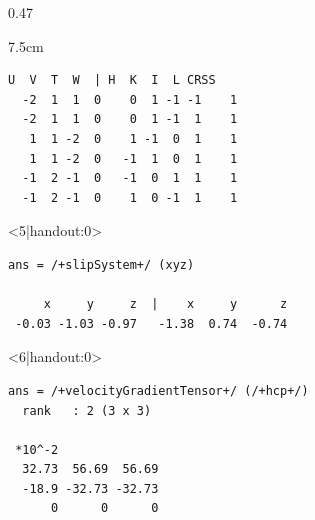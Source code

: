 \documentclass[compress,aspectratio=1610,fleqn]{beamer}
\begin{document}
\begin{frame}[fragile]
\begin{columns}
\begin{column}{0.47\textwidth}
\begin{overlayarea}{\textwidth}{7.5cm}
\begin{onlyenv}
\begin{lstlisting}[style=output]
   U  V  T  W  | H  K  I  L CRSS
  -2  1  1  0    0  1 -1 -1    1
  -2  1  1  0    0  1 -1  1    1
   1  1 -2  0    1 -1  0  1    1
   1  1 -2  0   -1  1  0  1    1
  -1  2 -1  0   -1  0  1  1    1
  -1  2 -1  0    1  0 -1  1    1
\end{lstlisting}
    \end{onlyenv}
    \begin{onlyenv}<5|handout:0>
\begin{lstlisting}[style=output]
ans = /+slipSystem+/ (xyz)

     x     y     z  |    x     y      z
 -0.03 -1.03 -0.97   -1.38  0.74  -0.74
\end{lstlisting}
    \end{onlyenv}
    \begin{onlyenv}<6|handout:0>
\begin{lstlisting}[style=output]
ans = /+velocityGradientTensor+/ (/+hcp+/)
  rank   : 2 (3 x 3)                    
 
 *10^-2
  32.73  56.69  56.69
  -18.9 -32.73 -32.73
      0      0      0
    \end{lstlisting}
    \end{onlyenv}

  \end{overlayarea}
\end{column}
\end{columns}

\end{frame}
\end{document}
